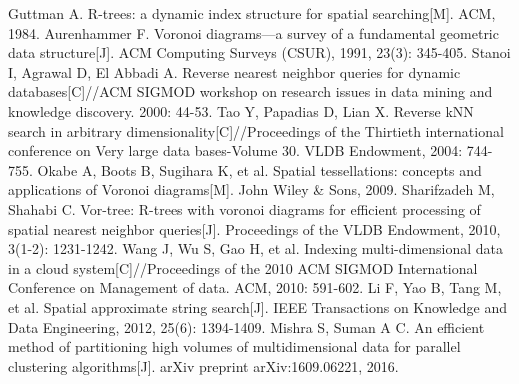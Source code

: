 \documentclass{ML}
\begin{document}
\appendix

\begin{thebibliography}{20}
     Guttman A. R-trees: a dynamic index structure for spatial searching[M]. ACM, 1984.
     Aurenhammer F. Voronoi diagrams—a survey of a fundamental geometric data structure[J]. ACM Computing Surveys (CSUR), 1991, 23(3): 345-405.
     Stanoi I, Agrawal D, El Abbadi A. Reverse nearest neighbor queries for dynamic databases[C]//ACM SIGMOD workshop on research issues in data mining and knowledge discovery. 2000: 44-53.
     Tao Y, Papadias D, Lian X. Reverse kNN search in arbitrary dimensionality[C]//Proceedings of the Thirtieth international conference on Very large data bases-Volume 30. VLDB Endowment, 2004: 744-755.
     Okabe A, Boots B, Sugihara K, et al. Spatial tessellations: concepts and applications of Voronoi diagrams[M]. John Wiley \& Sons, 2009.
     Sharifzadeh M, Shahabi C. Vor-tree: R-trees with voronoi diagrams for efficient processing of spatial nearest neighbor queries[J]. Proceedings of the VLDB Endowment, 2010, 3(1-2): 1231-1242.
     Wang J, Wu S, Gao H, et al. Indexing multi-dimensional data in a cloud system[C]//Proceedings of the 2010 ACM SIGMOD International Conference on Management of data. ACM, 2010: 591-602.
     Li F, Yao B, Tang M, et al. Spatial approximate string search[J]. IEEE Transactions on Knowledge and Data Engineering, 2012, 25(6): 1394-1409.
     Mishra S, Suman A C. An efficient method of partitioning high volumes of multidimensional data for parallel clustering algorithms[J]. arXiv preprint arXiv:1609.06221, 2016.
\end{thebibliography}
\end{document}
